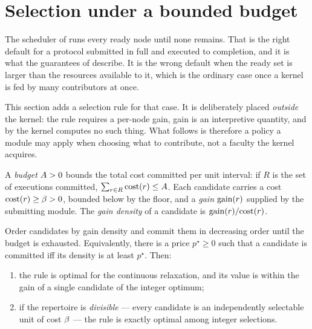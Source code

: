 
\section{Selection under a bounded budget}
\label{sec:budget}

The scheduler of  runs every ready node until none
remains. That is the right default for a protocol submitted in full and
executed to completion, and it is what the guarantees of
 describe. It is the wrong default when the ready set is
larger than the resources available to it, which is the ordinary case once a
kernel is fed by many contributors at once.

This section adds a selection rule for that case. It is deliberately placed
\emph{outside} the kernel: the rule requires a per-node gain, gain is an
interpretive quantity, and by  the kernel computes no such
thing. What follows is therefore a policy a module may apply when choosing
what to contribute, not a faculty the kernel acquires.

\begin{definition}
\label{def:budget}
A \emph{budget} $A>0$ bounds the total cost committed per unit interval:
if $R$ is the set of executions committed, $\sum_{r\in R}\mathrm{cost}(r)\le A$.
Each candidate carries a cost $\mathrm{cost}(r)\ge\beta>0$, bounded below by the
floor, and a \emph{gain} $\mathrm{gain}(r)$ supplied by the submitting module. The
\emph{gain density} of a candidate is $\mathrm{gain}(r)/\mathrm{cost}(r)$.
\end{definition}

\begin{theorem}
\label{thm:threshold}
Order candidates by gain density and commit them in decreasing order until
the budget is exhausted. Equivalently, there is a price $p^{\star}\ge0$ such
that a candidate is committed iff its density is at least $p^{\star}$. Then:
\begin{enumerate}[label=\textup{(\roman*)},leftmargin=2.2em]
\item the rule is optimal for the continuous relaxation, and its value is
within the gain of a single candidate of the integer optimum;
\item if the repertoire is \emph{divisible} --- every candidate is an
independently selectable unit of cost $\beta$ --- the rule is exactly optimal
among integer selections.
\end{enumerate}
\end{theorem}

